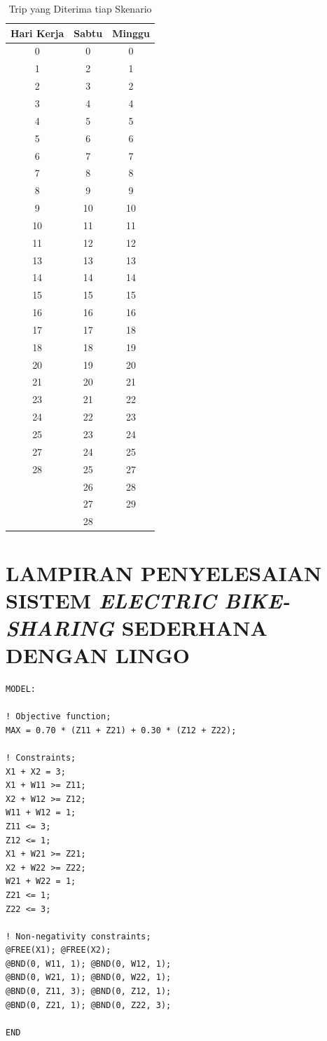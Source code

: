 \documentclass{skripsimathugm}
\begin{document}
\begin{table}[H]
\centering
\caption{Trip yang Diterima tiap Skenario}
\label{Accepted Trip IDs by Scenario}
\begin{tabular}{|c|c|c|}
\hline
\textbf{Hari Kerja} & \textbf{Sabtu} & \textbf{Minggu} \\
\hline
0 & 0 & 0 \\
1 & 2 & 1 \\
2 & 3 & 2 \\
3 & 4 & 4 \\
4 & 5 & 5 \\
5 & 6 & 6 \\
6 & 7 & 7 \\
7 & 8 & 8 \\
8 & 9 & 9 \\
9 & 10 & 10 \\
10 & 11 & 11 \\
11 & 12 & 12 \\
13 & 13 & 13 \\
14 & 14 & 14 \\
15 & 15 & 15 \\
16 & 16 & 16 \\
17 & 17 & 18 \\
18 & 18 & 19 \\
20 & 19 & 20 \\
21 & 20 & 21 \\
23 & 21 & 22 \\
24 & 22 & 23 \\
25 & 23 & 24 \\
27 & 24 & 25 \\
28 & 25 & 27 \\
 & 26 & 28 \\
 & 27 & 29 \\
 & 28 &  \\
\hline
\end{tabular}
\end{table}


\chapter{LAMPIRAN PENYELESAIAN SISTEM \textit{ELECTRIC BIKE-SHARING} SEDERHANA DENGAN LINGO}

\begin{verbatim}
MODEL:

! Objective function;
MAX = 0.70 * (Z11 + Z21) + 0.30 * (Z12 + Z22);

! Constraints;
X1 + X2 = 3;
X1 + W11 >= Z11;
X2 + W12 >= Z12;
W11 + W12 = 1;
Z11 <= 3;
Z12 <= 1;
X1 + W21 >= Z21;
X2 + W22 >= Z22;
W21 + W22 = 1;
Z21 <= 1;
Z22 <= 3;

! Non-negativity constraints;
@FREE(X1); @FREE(X2);
@BND(0, W11, 1); @BND(0, W12, 1);
@BND(0, W21, 1); @BND(0, W22, 1);
@BND(0, Z11, 3); @BND(0, Z12, 1);
@BND(0, Z21, 1); @BND(0, Z22, 3);

END
\end{verbatim}
\end{document}
